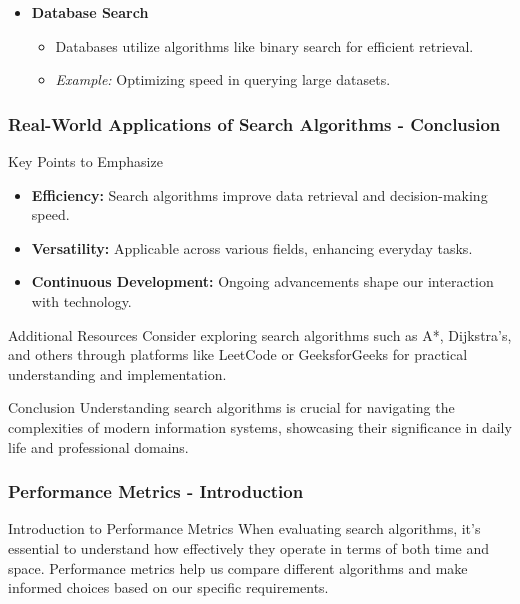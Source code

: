 \documentclass[aspectratio=169]{beamer}
\begin{document}
\begin{frame}[fragile]
\begin{itemize}
        \item \textbf{Database Search}
            \begin{itemize}
                \item Databases utilize algorithms like binary search for efficient retrieval.
                \item \textit{Example:} Optimizing speed in querying large datasets.
            \end{itemize}
    \end{itemize}
\end{frame}

\begin{frame}[fragile]
    \frametitle{Real-World Applications of Search Algorithms - Conclusion}
    \begin{block}{Key Points to Emphasize}
        \begin{itemize}
            \item \textbf{Efficiency:} Search algorithms improve data retrieval and decision-making speed.
            \item \textbf{Versatility:} Applicable across various fields, enhancing everyday tasks.
            \item \textbf{Continuous Development:} Ongoing advancements shape our interaction with technology.
        \end{itemize}
    \end{block}
    
    \begin{block}{Additional Resources}
        Consider exploring search algorithms such as A*, Dijkstra’s, and others through platforms like LeetCode or GeeksforGeeks for practical understanding and implementation.
    \end{block}

    \begin{block}{Conclusion}
        Understanding search algorithms is crucial for navigating the complexities of modern information systems, showcasing their significance in daily life and professional domains.
    \end{block}
\end{frame}

\begin{frame}[fragile]
    \frametitle{Performance Metrics - Introduction}
    \begin{block}{Introduction to Performance Metrics}
        When evaluating search algorithms, it's essential to understand how effectively they operate in terms of both time and space. Performance metrics help us compare different algorithms and make informed choices based on our specific requirements.
    \end{block}
\end{frame}
\end{document}
